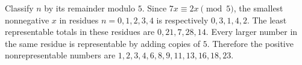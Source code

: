 Classify $n$ by its remainder modulo $5$. Since $7x\equiv 2x\pmod 5$, the smallest nonnegative $x$ in residues $n=0,1,2,3,4$ is respectively $0,3,1,4,2$. The least representable totals in these residues are $0,21,7,28,14$. Every larger number in the same residue is representable by adding copies of $5$. Therefore the positive nonrepresentable numbers are $\boxed{1,2,3,4,6,8,9,11,13,16,18,23}$.
